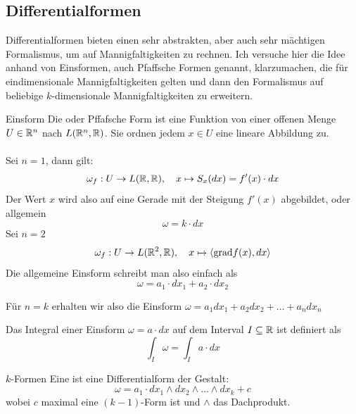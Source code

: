 \subsection{Differentialformen}
Differentialformen bieten einen sehr abstrakten, aber auch sehr mächtigen Formalismus, um auf Mannigfaltigkeiten zu rechnen. Ich versuche hier die Idee anhand von Einsformen, auch Pfaffsche Formen genannt, klarzumachen, die für eindimensionale Mannigfaltigkeiten gelten und dann den Formalismus auf beliebige $k$-dimensionale Mannigfaltigkeiten zu erweitern.
\begin{Def}{Einsform}
    Die  oder Pffafsche Form ist eine Funktion von einer offenen Menge $U\in \mathbb{R}^n$ nach $L(\mathbb{R}^n, \mathbb{R})$. Sie ordnen jedem $x\in U$ eine lineare Abbildung zu. \\ \\
    Sei $n=1$, dann gilt:
    $$\omega_f: U\rightarrow L(\mathbb{R}, \mathbb{R}), \quad x\mapsto S_x(dx)=f'(x)\cdot dx$$
    Der Wert $x$ wird also auf eine Gerade mit der Steigung $f'(x)$ abgebildet, oder allgemein
    $$\omega= k\cdot dx$$
    Sei $n=2$
    $$\omega_f: U\rightarrow L(\mathbb{R}^2, \mathbb{R}), \quad x\mapsto \braket{\text{grad} f(x), dx}$$
    Die allgemeine Einsform schreibt man also einfach als
    $$\omega = a_1\cdot dx_1+a_2\cdot dx_2$$

    Für $n=k$ erhalten wir also die Einsform $\omega = a_1 dx_1 + a_2 dx_2 + \dots + a_n dx_n$
\end{Def}
Das Integral einer Einsform $\omega=a\cdot dx$ auf dem Interval $I\subseteq \mathbb{R}$ ist definiert als $$\int_I \omega = \int_I a \cdot dx$$
\begin{Def}{$k$-Formen}
    Eine  ist eine Differentialform der Gestalt:
$$\omega = a_1 \cdot dx_1\land dx_2 \land ... \land dx_k + c$$
wobei $c$ maximal eine $(k-1)$-Form ist und $\land$ das Dachprodukt.
\end{Def}

